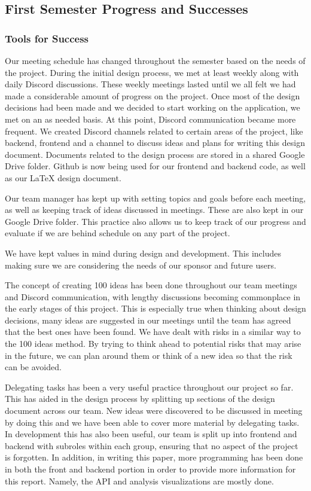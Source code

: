 \subsection{First Semester Progress and Successes}
\subsubsection{Tools for Success}
Our meeting schedule has changed throughout the semester based on the needs of the project. During the initial design process, we met at least weekly along with daily Discord discussions. These weekly meetings lasted until we all felt we had made a considerable amount of progress on the project. Once most of the design decisions had been made and we decided to start working on the application, we met on an as needed basis. At this point, Discord communication became more frequent. We created Discord channels related to certain areas of the project, like backend, frontend and a channel to discuss ideas and plans for writing this design document. Documents related to the design process are stored in a shared Google Drive folder. Github is now being used for our frontend and backend code, as well as our \LaTeX{} design document. \par
Our team manager has kept up with setting topics and goals before each meeting, as well as keeping track of ideas discussed in meetings. These are also kept in our Google Drive folder. This practice also allows us to keep track of our progress and evaluate if we are behind schedule on any part of the project. \par
We have kept values in mind during design and development. This includes making sure we are considering the needs of our sponsor and future users. \par
The concept of creating 100 ideas has been done throughout our team meetings and Discord communication, with lengthy discussions becoming commonplace in the early stages of this project. This is especially true when thinking about design decisions, many ideas are suggested in our meetings until the team has agreed that the best ones have been found. We have dealt with risks in a similar way to the 100 ideas method. By trying to think ahead to potential risks that may arise in the future, we can plan around them or think of a new idea so that the risk can be avoided. \par
Delegating tasks has been a very useful practice throughout our project so far. This has aided in the design process by splitting up sections of the design document across our team. New ideas were discovered to be discussed in meeting by doing this and we have been able to cover more material by delegating tasks. In development this has also been useful, our team is split up into frontend and backend with subroles within each group, ensuring that no aspect of the project is forgotten. In addition, in writing this paper, more programming has been done in both the front and backend portion in order to provide more information for this report. Namely, the API and analysis visualizations are mostly done. \par

